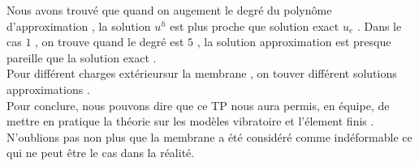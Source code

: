 \documentclass[a4paper,10pt]{report} %
\begin{document}
Nous avons trouvé que quand on augement le degré du polynôme d'approximation , la solution $u^h$ est plus proche que solution exact $u_e$ .
Dans le cas $1$ , on trouve quand le degré est $5$ ,  la solution approximation est presque pareille que la solution exact .\\

Pour différent charges extérieursur la membrane , on  touver différent solutions approximations . \\

Pour conclure, nous pouvons dire que ce TP nous aura permis, en équipe, de mettre en pratique la théorie sur les modèles vibratoire et l'élement finis .  N'oublions pas non plus que la membrane a été considéré comme indéformable ce qui ne peut être le cas dans la réalité.









%
%	
\end{document}
